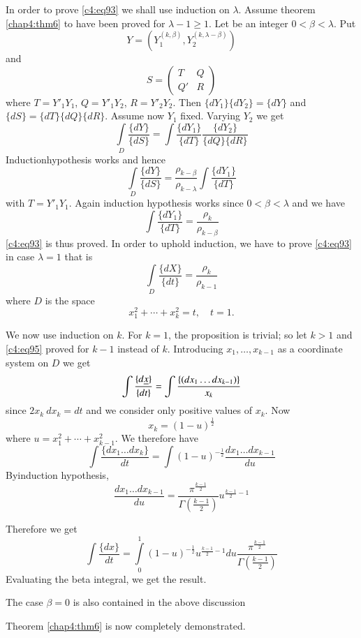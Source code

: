 In order to prove \eqref{c4:eq93} we shall use induction on
$\lambda$. Assume theorem \ref{chap4:thm6} to have been proved for
$\lambda-1\geq 1$. Let be an integer $0<\beta<\lambda$. Put 
$$
Y=\left(Y^{(k,\beta)}_{1}, Y^{(k,\lambda-\beta)}_{2}\right)
$$
and 
$$
S=
\begin{pmatrix}
T & Q\\
Q' & R
\end{pmatrix}
$$
where $T=Y'_{1}Y_{1}$, $Q=Y'_{1}Y_{2}$, $R=Y'_{2}Y_{2}$. Then
$\{dY_{1}\}\{dY_{2}\}=\{dY\}$ and $\{dS\}=\{dT\}\{dQ\}\{dR\}$. Assume
now $Y_{1}$ fixed. Varying $Y_{2}$ we get
$$
\int\limits_{D} \frac{\{dY\}}{\{dS\}}=\int
\frac{\{dY_{1}\}}{\{dT\}}\frac{\{dY_{2}\}}{\{dQ\}\{dR\}} 
$$
Induction\pageoriginale hypothesis works and hence
$$
\int\limits_{D}\frac{\{dY\}}{\{dS\}}=\frac{\rho_{k-\beta}}{\rho_{k-\lambda}}\int\frac{\{dY_{1}\}}{\{dT\}} 
$$
with $T=Y'_{1}Y_{1}$. Again induction hypothesis works since
$0<\beta<\lambda$ and we have
$$
\int\frac{\{dY_{1}\}}{\{dT\}}=\frac{\rho_{k}}{\rho_{k-\beta}}
$$
\eqref{c4:eq93} is thus proved. In order to uphold induction, we have to
prove \eqref{c4:eq93} in case $\lambda=1$ that is
\begin{equation*}
\int\limits_{D}\frac{\{dX\}}{\{dt\}}=\frac{\rho_{k}}{\rho_{k-1}}\tag{95}\label{c4:eq95} 
\end{equation*}
where $D$ is the space
$$
x^{2}_{1}+\cdots+x^{2}_{k}=t,\quad t=1.
$$

We now use induction on $k$. For $k=1$, the proposition is trivial; so
let $k>1$ and \eqref{c4:eq95} proved for $k-1$ instead of $k$. Introducing
$x_{1},\ldots,x_{k-1}$ as a coordinate system on $D$ we get
$$
\int\frac{\{d\underline{x}\}}{\{dt\}}=\int\frac{\{(dx_{1}\ldots
  dx_{k-1})\}}{x_{k}} 
$$
since $2x_{k} \ dx_{k}=dt$ and we consider only positive values of
$x_{k}$. Now
$$
x_{k}=(1-u)^{\frac{1}{2}}
$$
where $u=x^{2}_{1}+\cdots+x^{2}_{k-1}$. We therefore have
$$
\int\frac{\{dx_{1}\ldots
  dx_{k}\}}{dt}=\int(1-u)^{-\frac{1}{2}}\frac{dx_{1}\ldots
  dx_{k-1}}{du} 
$$
By\pageoriginale induction hypothesis,
$$
\frac{dx_{1}\ldots
  dx_{k-1}}{du}=\frac{\pi^{\frac{k-1}{2}}}{\Gamma(\frac{k-1}{2})}u^{\frac{k-1}{2}-1} 
$$

Therefore we get
$$
\int\frac{\{dx\}}{dt}=\int\limits^{1}_{0}(1-u)^{-\frac{1}{2}}u^{\frac{k-1}{2}-1}du
\frac{\pi^{\frac{k-1}{2}}}{\Gamma(\frac{k-1}{2})} 
$$
Evaluating the beta integral, we get the result.

The case $\beta=0$ is also contained in the above discussion

Theorem \ref{chap4:thm6} is now completely demonstrated.

